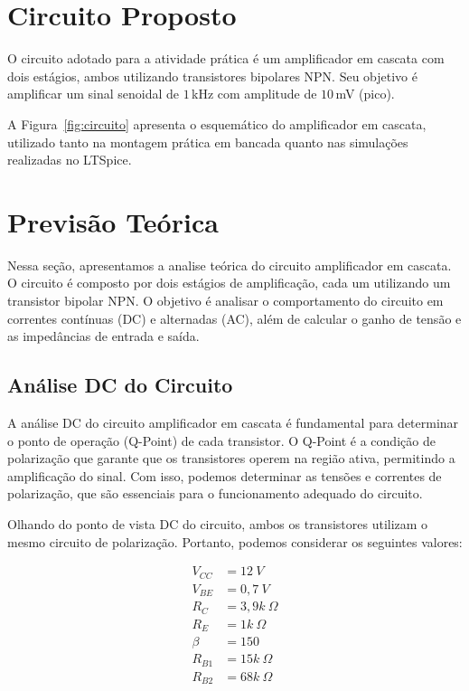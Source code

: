 \section{Circuito Proposto}

O circuito adotado para a atividade prática é um amplificador em cascata com dois estágios, ambos utilizando transistores bipolares NPN. Seu objetivo é amplificar um sinal senoidal de $1\,$kHz com amplitude de $10\,$mV (pico).

A Figura~\ref{fig:circuito} apresenta o esquemático do amplificador em cascata, utilizado tanto na montagem prática em bancada quanto nas simulações realizadas no LTSpice.


\section{Previsão Teórica}

Nessa seção, apresentamos a analise teórica do circuito amplificador em cascata. O circuito é composto por dois estágios de amplificação, cada um utilizando um transistor bipolar NPN. O objetivo é analisar o comportamento do circuito em correntes contínuas (DC) e alternadas (AC), além de calcular o ganho de tensão e as impedâncias de entrada e saída.

\subsection{Análise DC do Circuito}

A análise DC do circuito amplificador em cascata é fundamental para determinar o ponto de operação (Q-Point) de cada transistor. O Q-Point é a condição de polarização que garante que os transistores operem na região ativa, permitindo a amplificação do sinal. Com isso, podemos determinar as tensões e correntes de polarização, que são essenciais para o funcionamento adequado do circuito.

Olhando do ponto de vista DC do circuito, ambos os transistores utilizam o mesmo circuito de polarização. Portanto, podemos considerar os seguintes valores:

\begin{align}
    V_{CC} &= 12~V \\
    V_{BE} &= 0,7~V \\
    R_C &= 3,9k~\Omega \\
    R_E &= 1k~\Omega \\
    {\beta} &= 150 \\
    R_{B1} &= 15k~\Omega \\
    R_{B2} &= 68k~\Omega
\end{align}

